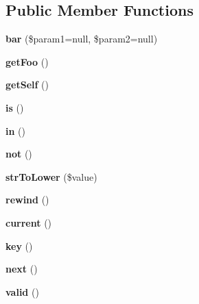 \subsection*{Public Member Functions}
\begin{DoxyCompactItemize}
\item 
{\bfseries bar} (\$param1=null, \$param2=null)\hypertarget{classTwigTestFoo_a0cd61ea4431bcd1a8b5c2eb99252fd34}{}\label{classTwigTestFoo_a0cd61ea4431bcd1a8b5c2eb99252fd34}

\item 
{\bfseries get\+Foo} ()\hypertarget{classTwigTestFoo_a509381c4fd095207ad8214b9c329daf3}{}\label{classTwigTestFoo_a509381c4fd095207ad8214b9c329daf3}

\item 
{\bfseries get\+Self} ()\hypertarget{classTwigTestFoo_ae2b67083ed93094e373b798a50fa2e0a}{}\label{classTwigTestFoo_ae2b67083ed93094e373b798a50fa2e0a}

\item 
{\bfseries is} ()\hypertarget{classTwigTestFoo_a1950dba9c1fe938f20b202d584ae4b96}{}\label{classTwigTestFoo_a1950dba9c1fe938f20b202d584ae4b96}

\item 
{\bfseries in} ()\hypertarget{classTwigTestFoo_a9e9be20741fab7a34dd0b75f0a4f8a7e}{}\label{classTwigTestFoo_a9e9be20741fab7a34dd0b75f0a4f8a7e}

\item 
{\bfseries not} ()\hypertarget{classTwigTestFoo_a173c251ea2194f5082502d92a99ab41a}{}\label{classTwigTestFoo_a173c251ea2194f5082502d92a99ab41a}

\item 
{\bfseries str\+To\+Lower} (\$value)\hypertarget{classTwigTestFoo_af771b6828d448cea0700f12aa6ec426c}{}\label{classTwigTestFoo_af771b6828d448cea0700f12aa6ec426c}

\item 
{\bfseries rewind} ()\hypertarget{classTwigTestFoo_a8c16271fc8c4b3bb8d7e6dde4a88b7ce}{}\label{classTwigTestFoo_a8c16271fc8c4b3bb8d7e6dde4a88b7ce}

\item 
{\bfseries current} ()\hypertarget{classTwigTestFoo_aa03e5b7003976cf5fb06577c02b8e5ae}{}\label{classTwigTestFoo_aa03e5b7003976cf5fb06577c02b8e5ae}

\item 
{\bfseries key} ()\hypertarget{classTwigTestFoo_a691180ac999b497c60b1dca72166edd2}{}\label{classTwigTestFoo_a691180ac999b497c60b1dca72166edd2}

\item 
{\bfseries next} ()\hypertarget{classTwigTestFoo_ae5e3178a91bf2fc15baba3b2f999cbcb}{}\label{classTwigTestFoo_ae5e3178a91bf2fc15baba3b2f999cbcb}

\item 
{\bfseries valid} ()\hypertarget{classTwigTestFoo_addc249d66db6102ce9163bebba36be56}{}\label{classTwigTestFoo_addc249d66db6102ce9163bebba36be56}

\end{DoxyCompactItemize}
